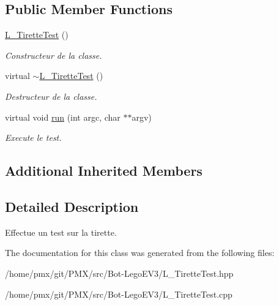 \subsection*{Public Member Functions}
\begin{DoxyCompactItemize}
\item 
\mbox{\label{classL__TiretteTest_a9762306420049a07a03b43d6b8fa88b6}} 
\hyperlink{classL__TiretteTest_a9762306420049a07a03b43d6b8fa88b6}{L\+\_\+\+Tirette\+Test} ()
\begin{DoxyCompactList}\small\item\em Constructeur de la classe. \end{DoxyCompactList}\item 
\mbox{\label{classL__TiretteTest_a1c04621a6cdd1cedaf425bb32209f111}} 
virtual \hyperlink{classL__TiretteTest_a1c04621a6cdd1cedaf425bb32209f111}{$\sim$\+L\+\_\+\+Tirette\+Test} ()
\begin{DoxyCompactList}\small\item\em Destructeur de la classe. \end{DoxyCompactList}\item 
\mbox{\label{classL__TiretteTest_a1c1901939ffe424db413a47561cea31d}} 
virtual void \hyperlink{classL__TiretteTest_a1c1901939ffe424db413a47561cea31d}{run} (int argc, char $\ast$$\ast$argv)
\begin{DoxyCompactList}\small\item\em Execute le test. \end{DoxyCompactList}\end{DoxyCompactItemize}
\subsection*{Additional Inherited Members}


\subsection{Detailed Description}
Effectue un test sur la tirette. 

The documentation for this class was generated from the following files\+:\begin{DoxyCompactItemize}
\item 
/home/pmx/git/\+P\+M\+X/src/\+Bot-\/\+Lego\+E\+V3/L\+\_\+\+Tirette\+Test.\+hpp\item 
/home/pmx/git/\+P\+M\+X/src/\+Bot-\/\+Lego\+E\+V3/L\+\_\+\+Tirette\+Test.\+cpp\end{DoxyCompactItemize}
